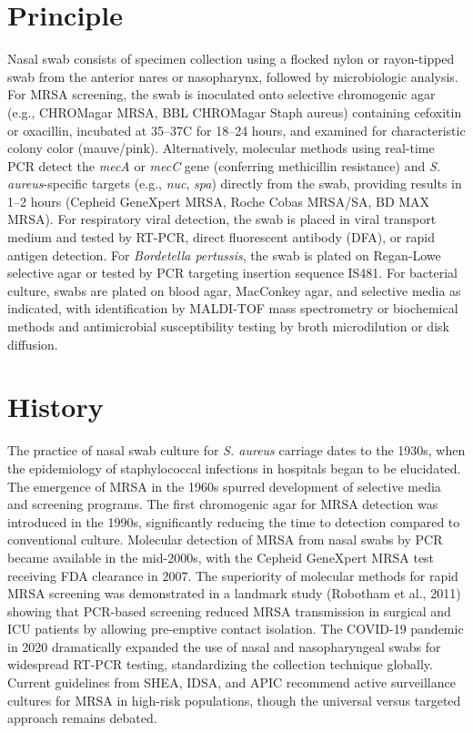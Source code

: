 \section*{Principle}
Nasal swab consists of specimen collection using a flocked nylon or rayon-tipped swab from the anterior nares or nasopharynx, followed by microbiologic analysis. For MRSA screening, the swab is inoculated onto selective chromogenic agar (e.g., CHROMagar MRSA, BBL CHROMagar Staph aureus) containing cefoxitin or oxacillin, incubated at 35--37\textdegree{}C for 18--24 hours, and examined for characteristic colony color (mauve/pink). Alternatively, molecular methods using real-time PCR detect the \textit{mecA} or \textit{mecC} gene (conferring methicillin resistance) and \textit{S. aureus}-specific targets (e.g., \textit{nuc}, \textit{spa}) directly from the swab, providing results in 1--2 hours (Cepheid GeneXpert MRSA, Roche Cobas MRSA/SA, BD MAX MRSA). For respiratory viral detection, the swab is placed in viral transport medium and tested by RT-PCR, direct fluorescent antibody (DFA), or rapid antigen detection. For \textit{Bordetella pertussis}, the swab is plated on Regan-Lowe selective agar or tested by PCR targeting insertion sequence IS481. For bacterial culture, swabs are plated on blood agar, MacConkey agar, and selective media as indicated, with identification by MALDI-TOF mass spectrometry or biochemical methods and antimicrobial susceptibility testing by broth microdilution or disk diffusion.

\section*{History}
The practice of nasal swab culture for \textit{S. aureus} carriage dates to the 1930s, when the epidemiology of staphylococcal infections in hospitals began to be elucidated. The emergence of MRSA in the 1960s spurred development of selective media and screening programs. The first chromogenic agar for MRSA detection was introduced in the 1990s, significantly reducing the time to detection compared to conventional culture. Molecular detection of MRSA from nasal swabs by PCR became available in the mid-2000s, with the Cepheid GeneXpert MRSA test receiving FDA clearance in 2007. The superiority of molecular methods for rapid MRSA screening was demonstrated in a landmark study (Robotham et al., 2011) showing that PCR-based screening reduced MRSA transmission in surgical and ICU patients by allowing pre-emptive contact isolation. The COVID-19 pandemic in 2020 dramatically expanded the use of nasal and nasopharyngeal swabs for widespread RT-PCR testing, standardizing the collection technique globally. Current guidelines from SHEA, IDSA, and APIC recommend active surveillance cultures for MRSA in high-risk populations, though the universal versus targeted approach remains debated.

